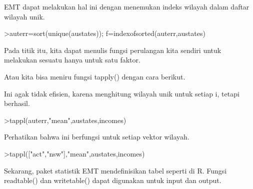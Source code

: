 \documentclass[a4paper,10pt]{article}
\begin{document}
\begin{eulernotebook}
\begin{eulercomment}
\begin{eulercomment}
\begin{eulercomment}
EMT dapat melakukan hal ini dengan menemukan indeks wilayah dalam
daftar wilayah unik.
\end{eulercomment}
\begin{eulerprompt}
>auterr=sort(unique(austates)); f=indexofsorted(auterr,austates)
\end{eulerprompt}
\begin{euleroutput}
  [6,  5,  4,  2,  2,  3,  8,  8,  4,  7,  2,  7,  4,  4,  5,  6,  5,  3,  8,  7,  4,  2,  2,  8,
  5,  1,  2,  7,  7,  1]
\end{euleroutput}
\begin{eulercomment}
Pada titik itu, kita dapat menulis fungsi perulangan kita sendiri
untuk melakukan sesuatu hanya untuk satu faktor.

Atau kita bisa meniru fungsi tapply() dengan cara berikut.
\end{eulercomment}
\begin{eulercomment}
Ini agak tidak efisien, karena menghitung wilayah unik untuk setiap i,
tetapi berhasil.
\end{eulercomment}
\begin{eulerprompt}
>tappl(auterr,"mean",austates,incomes)
\end{eulerprompt}
\begin{euleroutput}
  [44.5,  57.3333333333,  55.5,  53.6,  55,  60.5,  56,  52.25]
\end{euleroutput}
\begin{eulercomment}
Perhatikan bahwa ini berfungsi untuk setiap vektor wilayah.
\end{eulercomment}
\begin{eulerprompt}
>tappl(["act","nsw"],"mean",austates,incomes)
\end{eulerprompt}
\begin{euleroutput}
  [44.5,  57.3333333333]
\end{euleroutput}
\begin{eulercomment}
Sekarang, paket statistik EMT mendefinisikan tabel seperti di R.
Fungsi readtable() dan writetable() dapat digunakan untuk input dan
output.


\end{eulercomment}
\end{eulercomment}
\end{eulercomment}
\end{eulernotebook}
\end{document}
